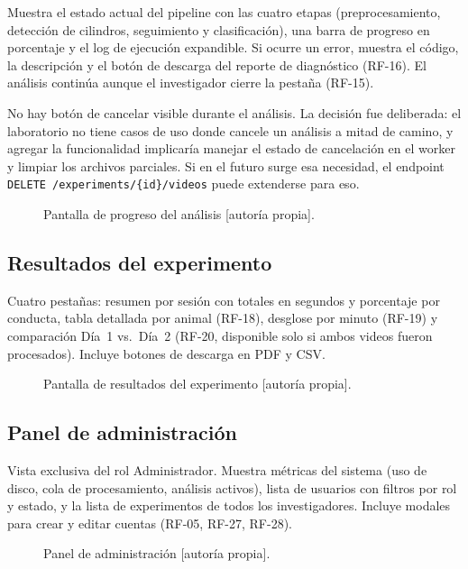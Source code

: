 Muestra el estado actual del pipeline con las cuatro etapas (preprocesamiento,
detección de cilindros, seguimiento y clasificación), una barra de progreso en
porcentaje y el log de ejecución expandible. Si ocurre un error, muestra el código,
la descripción y el botón de descarga del reporte de diagnóstico (RF-16). El análisis
continúa aunque el investigador cierre la pestaña (RF-15).

No hay botón de cancelar visible durante el análisis. La decisión fue deliberada: el
laboratorio no tiene casos de uso donde cancele un análisis a mitad de camino, y
agregar la funcionalidad implicaría manejar el estado de cancelación en el worker y
limpiar los archivos parciales. Si en el futuro surge esa necesidad, el endpoint
\texttt{DELETE /experiments/\{id\}/videos} puede extenderse para eso.

\begin{figure}[ht]
\centering
\caption{Pantalla de progreso del análisis [autoría propia].}
\label{fig:ui_progreso}
\end{figure}

\subsection{Resultados del experimento}

Cuatro pestañas: resumen por sesión con totales en segundos y porcentaje por conducta,
tabla detallada por animal (RF-18), desglose por minuto (RF-19) y comparación
Día~1 vs.\ Día~2 (RF-20, disponible solo si ambos videos fueron procesados). Incluye
botones de descarga en PDF y CSV.

\begin{figure}[ht]
\centering
\caption{Pantalla de resultados del experimento [autoría propia].}
\label{fig:ui_resultados}
\end{figure}

\subsection{Panel de administración}

Vista exclusiva del rol Administrador. Muestra métricas del sistema (uso de disco,
cola de procesamiento, análisis activos), lista de usuarios con filtros por rol y
estado, y la lista de experimentos de todos los investigadores. Incluye modales para
crear y editar cuentas (RF-05, RF-27, RF-28).

\begin{figure}[ht]
\centering
\caption{Panel de administración [autoría propia].}
\label{fig:ui_admin}
\end{figure}